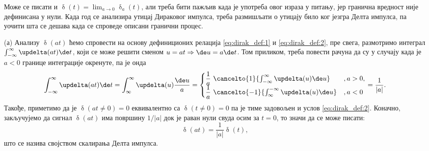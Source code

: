 \noindent
Може се писати и $\updelta(t) = \lim_{a\to 0} \updelta_a(t)$, али треба бити пажљив када је употреба овог израза у питању,
јер гранична вредност није дефинисана у нули. Када год се анализира утицај Дираковог импулса, треба размишљати о утицају
било ког језгра Делта импулса, па уочити шта се дешава када се спроведе описани гранични процес. 

(а) Анализу $\updelta(at)$ ћемо спровести на основу дефиниционих релација \eqref{eq:dirak_def:1} и \eqref{eq:dirak_def:2},
пре свега, размотримо интеграл $\int_{-\infty}^{\infty} \updelta(at) \de t$, који се може решити сменом 
$u = at \Rightarrow \de u = a \de t$. Том приликом, треба повести рачуна да су у случају када је $a<0$ границе интеграције окренуте, па је онда 
\begin{equation}
    \int_{-\infty}^{\infty} \updelta(at) \de t = 
    \int_{\-\infty}^{\infty} \updelta(u) \dfrac{\de u}{a} 
    = 
    \begin{cases}
    \dfrac{1}{a} \,\, \cancelto{1}{\int_{-\infty}^{\infty} \updelta(u) \de u} &, a > 0, \\
    \dfrac{1}{a} \,\, \cancelto{-1}{\int_{\infty}^{-\infty} \updelta(u) \de u} &, a < 0
    \end{cases}
    = \dfrac{1}{|a|}.
\end{equation}
Такође, приметимо да је $\updelta(at \neq 0) = 0$ еквивалентно са $\updelta(t \neq 0) = 0$ па је тиме задовољен и 
услов \eqref{eq:dirak_def:2}. Коначно, закључујемо да сигнал $\updelta(at)$ има површину $1/|a|$ док је раван нули свуда
осим за $t=0$, то значи да се може писати: 
\begin{equation}
    \updelta(at) = \dfrac{1}{|a|} \updelta(t), 
\end{equation}
што се назива својством скалирања Делта импулса. 

